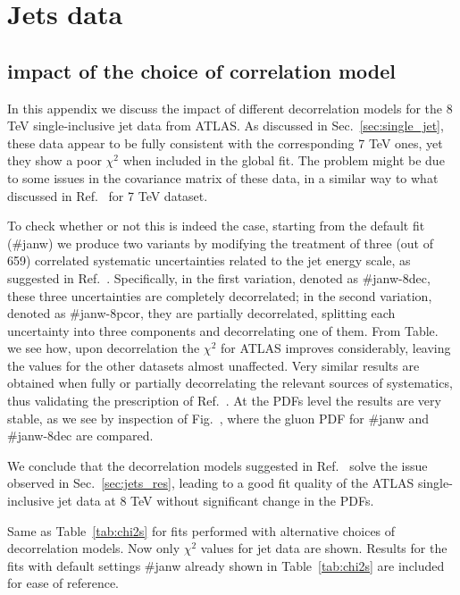 \chapter{Jets data}
\label{app:jets}
\section{impact of the choice of correlation model}
In this appendix we discuss the impact of different decorrelation models for the 8 TeV single-inclusive jet data
from ATLAS.
As discussed in Sec.~\ref{sec:single_jet}, these data appear to be fully consistent with the corresponding
7 TeV ones, yet they show a poor $\chi^2$ when included in the global fit.
The problem might be due to some issues in the covariance matrix of these data, in a similar way 
to what discussed in Ref.~\cite{Harland-Lang:2017ytb} for 7 TeV dataset.

%
To check whether or not this is indeed the case, starting from the default fit (\#janw) we produce two variants 
by modifying the treatment of three (out of 659) correlated systematic uncertainties
related to the jet energy scale, as suggested in Ref.~\cite{Aaboud:2017dvo}.
Specifically, in the first variation, denoted as \#janw-8dec, these three uncertainties are completely decorrelated;
in the second variation, denoted as \#janw-8pcor, they are partially decorrelated, splitting each uncertainty 
into three components and decorrelating one of them.
From Table.~ we see how, upon decorrelation the $\chi^2$ for ATLAS improves considerably, leaving the 
values for the other datasets almost unaffected. Very similar results are obtained when fully or partially 
decorrelating the relevant sources of systematics, thus validating the prescription of Ref.~\cite{Aaboud:2017dvo}.
At the PDFs level the results are very stable, as we see by inspection of Fig.~, where the gluon PDF for 
\#janw and \#janw-8dec are compared.

%
We conclude that the decorrelation models suggested in Ref.~\cite{Aaboud:2017dvo} solve the issue observed in
Sec.~\ref{sec:jets_res}, leading to a good fit quality of the ATLAS single-inclusive jet data at 8 TeV without
significant change in the PDFs.

\begin{table}[!t]
    \renewcommand*{\arraystretch}{1.60}
    \scriptsize
    \centering
    
    \vspace{0.3cm}
    \caption{Same as Table~\ref{tab:chi2s} for
      fits performed with alternative choices of decorrelation models.
      Now only $\chi^2$ values for jet data are shown. Results for the fits with default settings
      \#janw already shown  in Table~\ref{tab:chi2s} are included for ease of reference.}
    \label{tab:chi2_suppl}
\end{table}

